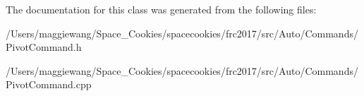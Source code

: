 The documentation for this class was generated from the following files\+:\begin{DoxyCompactItemize}
\item 
/\+Users/maggiewang/\+Space\+\_\+\+Cookies/spacecookies/frc2017/src/\+Auto/\+Commands/Pivot\+Command.\+h\item 
/\+Users/maggiewang/\+Space\+\_\+\+Cookies/spacecookies/frc2017/src/\+Auto/\+Commands/Pivot\+Command.\+cpp\end{DoxyCompactItemize}
